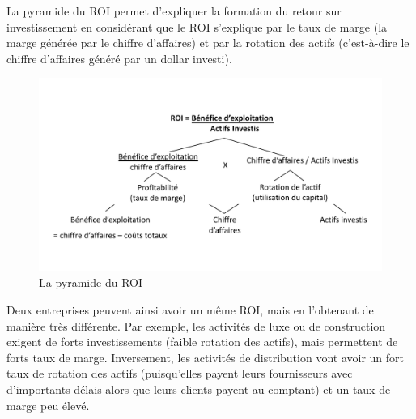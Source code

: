 \documentclass{tufte-handout}
\begin{document}
\begin{enumerate}
La pyramide du ROI permet d'expliquer la formation du retour sur investissement en considérant que le ROI s'explique par le taux de marge (la marge générée par le chiffre d'affaires) et par la rotation des actifs (c'est-à-dire le chiffre d'affaires généré par un dollar investi).\\
\begin{figure}[htbp]
\centering
\includegraphics[width=.9\linewidth]{./img/roi.pdf}
\caption{La pyramide du ROI}
\end{figure}

Deux entreprises peuvent ainsi avoir un même ROI, mais en l'obtenant de manière très différente. Par exemple, les activités de luxe ou de construction exigent de forts investissements (faible rotation des actifs), mais permettent de forts taux de marge. Inversement, les activités de distribution vont avoir un fort taux de rotation des actifs (puisqu'elles payent leurs fournisseurs avec d'importants délais alors que leurs clients payent au comptant) et un taux de marge peu élevé.\\


\end{enumerate}
\end{document}
